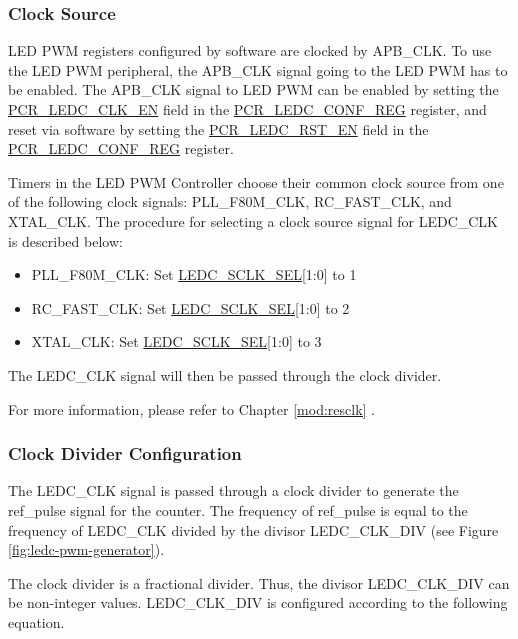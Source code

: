 \documentclass[main\_\_EN.tex]{subfiles}
\begin{document}
\subsubsection{Clock Source}

LED PWM registers configured by software are clocked by APB\_CLK. To use the LED PWM peripheral, the APB\_CLK signal going to the LED PWM has to be enabled. The APB\_CLK signal to LED PWM can be enabled by setting the \hyperref[fielddesc:PCRLEDCCLKEN]{PCR\_LEDC\_CLK\_EN} field in the \hyperref[regdesc:PCRLEDCCONFREG]{PCR\_LEDC\_CONF\_REG} register, and reset via software by setting the \hyperref[fielddesc:PCRLEDCRSTEN]{PCR\_LEDC\_RST\_EN} field in the \hyperref[regdesc:PCRLEDCCONFREG]{PCR\_LEDC\_CONF\_REG} register.

Timers in the LED PWM Controller choose their common clock source from one of the following clock signals: PLL\_F80M\_CLK, RC\_FAST\_CLK, and XTAL\_CLK. The procedure for selecting a clock source signal for LEDC\_CLK is described below:

\begin{itemize}
    \item PLL\_F80M\_CLK: Set \hyperref[fielddesc:LEDCSCLKSEL]{LEDC\_SCLK\_SEL}[1:0] to 1
    \item RC\_FAST\_CLK: Set \hyperref[fielddesc:LEDCSCLKSEL]{LEDC\_SCLK\_SEL}[1:0] to 2
    \item XTAL\_CLK: Set \hyperref[fielddesc:LEDCSCLKSEL]{LEDC\_SCLK\_SEL}[1:0] to 3

\end{itemize}

The LEDC\_CLK signal will then be passed through the clock divider.

For more information, please refer to Chapter \ref{mod:resclk} \textit{}.

\subsubsection{Clock Divider Configuration}

The LEDC\_CLK signal is passed through a clock divider to generate the ref\_pulse signal for the counter. The frequency of ref\_pulse is equal to the frequency of LEDC\_CLK divided by the divisor LEDC\_CLK\_DIV (see Figure \ref{fig:ledc-pwm-generator}).

The clock divider is a fractional divider. Thus, the divisor LEDC\_CLK\_DIV can be  non-integer values. LEDC\_CLK\_DIV is configured according to the following equation.
\end{document}
